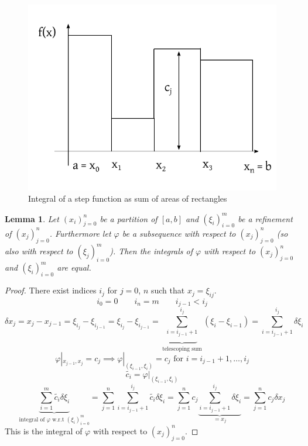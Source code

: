 \documentclass{article}
\newtheorem{lemma}{Lemma}  \numberwithin{lemma}{section}
\begin{document}
\begin{figure}[!h]
  \begin{center}
    \includegraphics{img/12_integral_of_a_step_function.pdf}
    \caption{Integral of a step function as sum of areas of rectangles}
  \end{center}
\end{figure}

\begin{lemma} %
  \label{lemma2}
  Let $(x_i)_{j=0}^n$ be a partition of $[a,b]$ and $(\xi_i)_{i=0}^m$ be a refinement of $(x_j)_{j=0}^n$.
  Furthermore let $\varphi$ be a subsequence with respect to $(x_j)_{j=0}^n$ (so also with respect to $(\xi_j)_{i=0}^m$).
  Then the integrals of $\varphi$ with respect to $(x_j)_{j=0}^n$ and $(\xi_i)_{i=0}^m$ are equal.
\end{lemma}

\begin{proof}
  There exist indices $i_j$ for $j=0$, $n$ such that $x_j = \xi_{ij}$.
  \[ i_0 = 0 \qquad i_n = m \qquad i_{j-1} < i_j \]
  \[ \delta x_j = x_j - x_{j-1} = \xi_{i_j} - \xi_{i_{j-1}} = \xi_{i_j} - \xi_{i_{j-1}} = \underbrace{\sum_{i=i_{j-1}+1}^{i_j}}_{\text{telescoping sum}} (\xi_i - \xi_{i-1}) = \sum_{i=i_{j-1}+1}^{i_j} \delta \xi_i \]
  \[ \varphi|_{x_{j-1},x_j} = c_j \implies \varphi|_{(\xi_{i-1},\xi_i)} = c_j \text{ for } i = i_{j-1}+1, \dots, i_j \]
  \[ \tilde{c_i} = \varphi|_{(\xi_{i-1},\xi_i)} \]
  \[ \underbrace{\sum_{i=1}^m \tilde{c_i} \delta \xi_i}_{\text{integral of $\varphi$ w.r.t $(\xi_i)_{i=0}^m$}} = \sum_{j=1}^n \sum_{i=i_{j-1}+1}^{i_j} \tilde{c_i} \delta \xi_i = \sum_{j=1}^n c_j \underbrace{\sum_{i=i_{j-1}+1}^{i_j} \delta \xi_i}_{=  x_j} = \sum_{j=1}^n c_j \delta x_j \]
  This is the integral of $\varphi$ with respect to $(x_j)_{j=0}^n$.
\end{proof}
\end{document}
